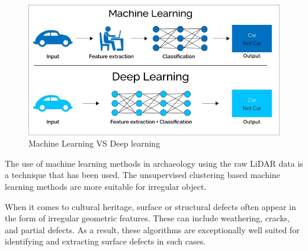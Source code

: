 \begin{figure}[H]
\centering
\includegraphics[width=15cm]{images/deepLearningVSmachineLearning.jpeg}
\caption{Machine Learning VS Deep learning\cite{deepLearningVSmachineLearning}}
\end{figure}

The use of machine learning methods in archaeology using the raw LiDAR data is a technique that has been used. The unsupervised clustering based machine learning methods are more suitable for irregular object\cite{rawLidarjoaofonte}.

When it comes to cultural heritage, surface or structural defects often appear in the form of irregular geometric features. These can include weathering, cracks, and partial defects. As a result, these algorithms are exceptionally well suited for identifying and extracting surface defects in such cases.